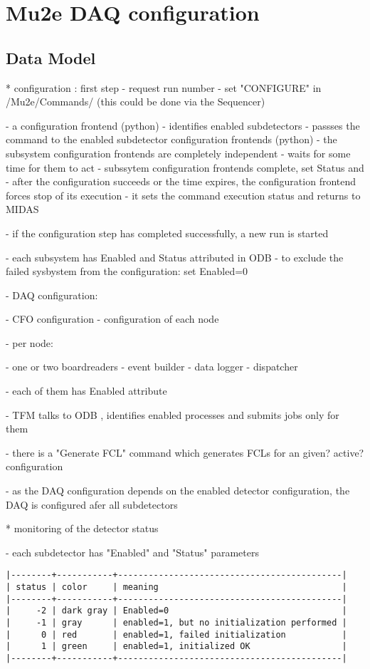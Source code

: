 \section{Mu2e DAQ configuration}

\subsection{Data Model}

* configuration  : first step                                                
- request run number
- set "CONFIGURE" in /Mu2e/Commands/ (this could be done via the Sequencer)

- a configuration frontend (python)
  - identifies enabled subdetectors
  - passses the command to the enabled subdetector configuration frontends (python)
  - the subsystem configuration frontends are completely independent
  - waits for some time for them to act
  - subssytem configuration frontends complete, set Status and 
  - after the configuration succeeds or the time expires, the configuration
    frontend forces stop of its execution
  - it sets the command execution status and returns to MIDAS

- if the configuration step has completed successfully, a new run is started

- each subsystem has Enabled and Status attributed in ODB
- to exclude the failed sysbystem from the configuration: set Enabled=0

- DAQ configuration:

  - CFO configuration
  - configuration of each node

  - per node:

    - one or two boardreaders
    - event builder
    - data logger
    - dispatcher

    - each of them has Enabled attribute

  - TFM talks to ODB , identifies enabled processes and submits jobs only
    for them

  - there is a "Generate FCL" command which generates FCLs
    for an given? active? configuration

- as the DAQ configuration depends on the enabled detector configuration,
  the DAQ is configured afer all subdetectors 


* monitoring of the detector status                                          

- each subdetector has "Enabled" and "Status" parameters
\begin{verbatim}
|--------+-----------+--------------------------------------------|
| status | color     | meaning                                    |
|--------+-----------+--------------------------------------------|
|     -2 | dark gray | Enabled=0                                  |
|     -1 | gray      | enabled=1, but no initialization performed |
|      0 | red       | enabled=1, failed initialization           |
|      1 | green     | enabled=1, initialized OK                  |
|--------+-----------+--------------------------------------------|
\end{verbatim}

